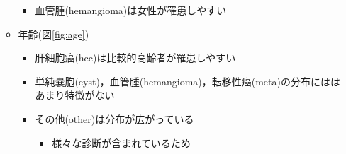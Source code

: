 \documentclass[a4j]{ujarticle}
\newcommand{\Fref}[1]{\mbox{図\ref{fig:#1}}}
\begin{document}
\begin{itemize}
\begin{itemize}
\begin{itemize}
                    \item 血管腫(hemangioma)は女性が罹患しやすい
                \end{itemize}
                \item 年齢(\Fref{age})
                \begin{itemize}
                    \item 肝細胞癌(hcc)は比較的高齢者が罹患しやすい
                    \item 単純嚢胞(cyst)，血管腫(hemangioma)，転移性癌(meta)の分布にははあまり特徴がない
                    \item その他(other)は分布が広がっている
                    \begin{itemize}
                        \item 様々な診断が含まれているため
                    \end{itemize}
                \end{itemize}
            \end{itemize}
        \end{itemize}
\end{document}
